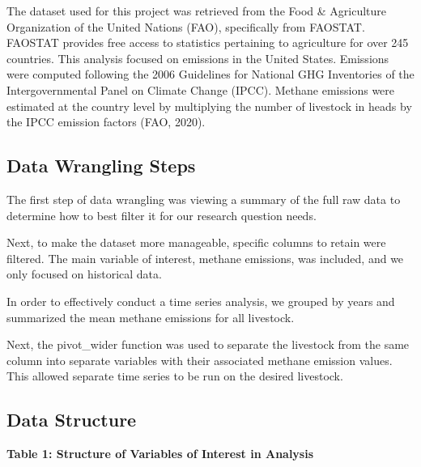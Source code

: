 \documentclass[
  12pt,
]{article}
\begin{document}
The dataset used for this project was retrieved from the Food \&
Agriculture Organization of the United Nations (FAO), specifically from
FAOSTAT. FAOSTAT provides free access to statistics pertaining to
agriculture for over 245 countries. This analysis focused on emissions
in the United States. Emissions were computed following the 2006
Guidelines for National GHG Inventories of the Intergovernmental Panel
on Climate Change (IPCC). Methane emissions were estimated at the
country level by multiplying the number of livestock in heads by the
IPCC emission factors (FAO, 2020).

\hypertarget{data-wrangling-steps}{%
\subsection{Data Wrangling Steps}\label{data-wrangling-steps}}

The first step of data wrangling was viewing a summary of the full raw
data to determine how to best filter it for our research question needs.

Next, to make the dataset more manageable, specific columns to retain
were filtered. The main variable of interest, methane emissions, was
included, and we only focused on historical data.

In order to effectively conduct a time series analysis, we grouped by
years and summarized the mean methane emissions for all livestock.

Next, the pivot\_wider function was used to separate the livestock from
the same column into separate variables with their associated methane
emission values. This allowed separate time series to be run on the
desired livestock.

\hypertarget{data-structure}{%
\subsection{Data Structure}\label{data-structure}}

\textbf{Table 1: Structure of Variables of Interest in Analysis}
\end{document}
